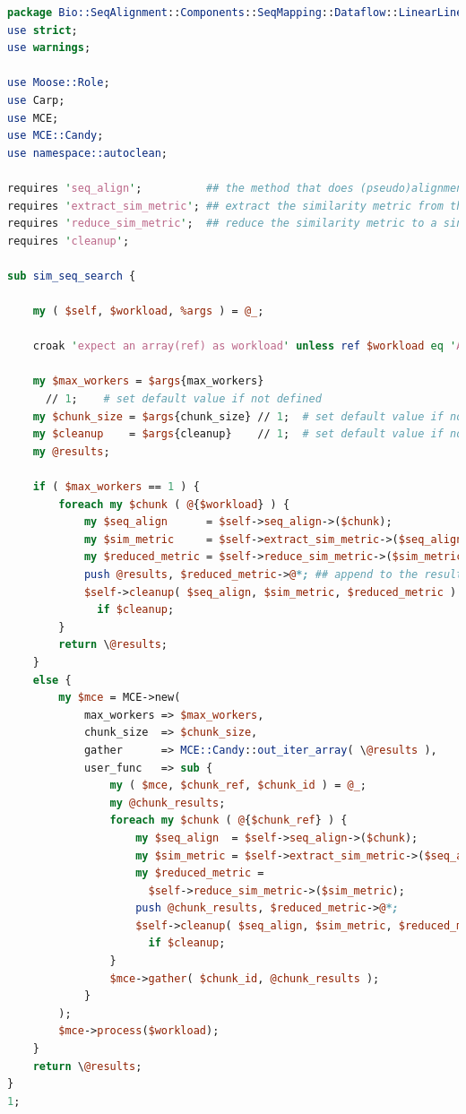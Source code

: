 \documentclass[10pt]{article}
\begin{document}
\newpage
\begin{lstlisting}[language=Perl,basicstyle=\footnotesize,frame=none,caption={Perl code for the \texttt{sim\_seq\_search} of the \textbf{LinearLinearGeneric} role.},label={lst:LinearLinearGenericRoleCode},captionpos=b]
package Bio::SeqAlignment::Components::SeqMapping::Dataflow::LinearLinearGeneric;
use strict;
use warnings;

use Moose::Role;
use Carp;
use MCE;
use MCE::Candy;
use namespace::autoclean;

requires 'seq_align';          ## the method that does (pseudo)alignment
requires 'extract_sim_metric'; ## extract the similarity metric from the search
requires 'reduce_sim_metric';  ## reduce the similarity metric to a single value
requires 'cleanup';

sub sim_seq_search {

    my ( $self, $workload, %args ) = @_;

    croak 'expect an array(ref) as workload' unless ref $workload eq 'ARRAY';

    my $max_workers = $args{max_workers}
      // 1;    # set default value if not defined
    my $chunk_size = $args{chunk_size} // 1;  # set default value if not defined
    my $cleanup    = $args{cleanup}    // 1;  # set default value if not defined
    my @results;

    if ( $max_workers == 1 ) {
        foreach my $chunk ( @{$workload} ) {
            my $seq_align      = $self->seq_align->($chunk);
            my $sim_metric     = $self->extract_sim_metric->($seq_align);
            my $reduced_metric = $self->reduce_sim_metric->($sim_metric);
            push @results, $reduced_metric->@*; ## append to the results
            $self->cleanup( $seq_align, $sim_metric, $reduced_metric )
              if $cleanup;
        }
        return \@results;
    }
    else {
        my $mce = MCE->new(
            max_workers => $max_workers,
            chunk_size  => $chunk_size,
            gather      => MCE::Candy::out_iter_array( \@results ),
            user_func   => sub {
                my ( $mce, $chunk_ref, $chunk_id ) = @_;
                my @chunk_results;
                foreach my $chunk ( @{$chunk_ref} ) {
                    my $seq_align  = $self->seq_align->($chunk);
                    my $sim_metric = $self->extract_sim_metric->($seq_align);
                    my $reduced_metric =
                      $self->reduce_sim_metric->($sim_metric);
                    push @chunk_results, $reduced_metric->@*;
                    $self->cleanup( $seq_align, $sim_metric, $reduced_metric )
                      if $cleanup;
                }
                $mce->gather( $chunk_id, @chunk_results );
            }
        );
        $mce->process($workload);
    }
    return \@results;
}
1;
\end{lstlisting}
\end{document}

